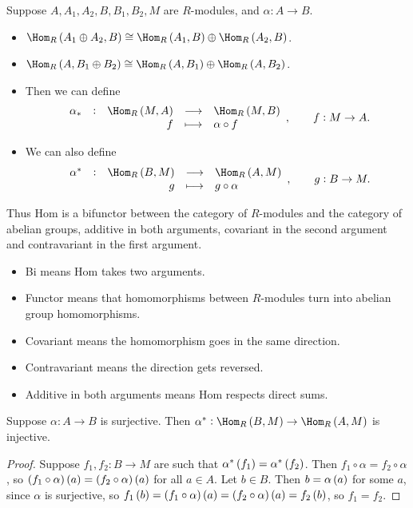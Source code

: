 \begin{proposition}
Suppose $ A, A_1, A_2, B, B_1, B_2, M $ are $ R $-modules, and $ \alpha : A \to B $.
\begin{itemize}
\item $ \Hom_R\br{A_1 \oplus A_2, B} \cong \Hom_R\br{A_1, B} \oplus \Hom_R\br{A_2, B} $.
\item $ \Hom_R\br{A, B_1 \oplus B_2} \cong \Hom_R\br{A, B_1} \oplus \Hom_R\br{A, B_2} $.
\item Then we can define
$$ \function[\alpha_*]{\Hom_R\br{M, A}}{\Hom_R\br{M, B}}{f}{\alpha \circ f}, \qquad f : M \to A. $$
\item We can also define
$$ \function[\alpha^*]{\Hom_R\br{B, M}}{\Hom_R\br{A, M}}{g}{g \circ \alpha}, \qquad g : B \to M. $$
\end{itemize}
\end{proposition}

Thus Hom is a bifunctor between the category of $ R $-modules and the category of abelian groups, additive in both arguments, covariant in the second argument and contravariant in the first argument.
\begin{itemize}
\item Bi means Hom takes two arguments.
\item Functor means that homomorphisms between $ R $-modules turn into abelian group homomorphisms.
\item Covariant means the homomorphism goes in the same direction.
\item Contravariant means the direction gets reversed.
\item Additive in both arguments means Hom respects direct sums.
\end{itemize}

\begin{proposition}
Suppose $ \alpha : A \to B $ is surjective. Then $ \alpha^* : \Hom_R\br{B, M} \to \Hom_R\br{A, M} $ is injective.
\end{proposition}

\begin{proof}
Suppose $ f_1, f_2 : B \to M $ are such that $ \alpha^*\br{f_1} = \alpha^*\br{f_2} $. Then $ f_1 \circ \alpha = f_2 \circ \alpha $, so $ \br{f_1 \circ \alpha}\br{a} = \br{f_2 \circ \alpha}\br{a} $ for all $ a \in A $. Let $ b \in B $. Then $ b = \alpha\br{a} $ for some $ a $, since $ \alpha $ is surjective, so $ f_1\br{b} = \br{f_1 \circ \alpha}\br{a} = \br{f_2 \circ \alpha}\br{a} = f_2\br{b} $, so $ f_1 = f_2 $.
\end{proof}

